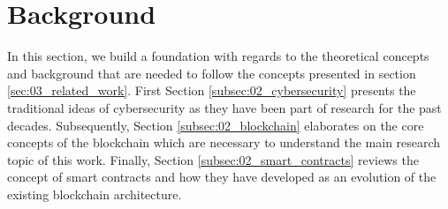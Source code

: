\section{Background}
\label{sec:02_background}

In this section, we build a foundation with regards to the theoretical concepts and background that are needed to follow the concepts presented in section \ref{sec:03_related_work}. First Section \ref{subsec:02_cybersecurity} presents the traditional ideas of cybersecurity as they have been part of research for the past decades. Subsequently, Section \ref{subsec:02_blockchain} elaborates on the core concepts of the blockchain which are necessary to understand the main research topic of this work. Finally, Section \ref{subsec:02_smart_contracts} reviews the concept of smart contracts and how they have developed as an evolution of the existing blockchain architecture.




